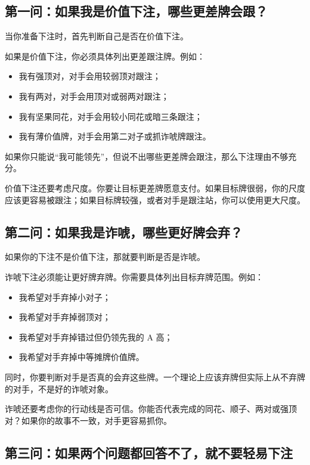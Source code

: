 \subsection{第一问：如果我是价值下注，哪些更差牌会跟？}

当你准备下注时，首先判断自己是否在价值下注。

如果是价值下注，你必须具体列出更差跟注牌。例如：

\begin{itemize}
\item 我有强顶对，对手会用较弱顶对跟注；
\item 我有两对，对手会用顶对或弱两对跟注；
\item 我有坚果同花，对手会用较小同花或暗三条跟注；
\item 我有薄价值牌，对手会用第二对子或抓诈唬牌跟注。
\end{itemize}

如果你只能说“我可能领先”，但说不出哪些更差牌会跟注，那么下注理由不够充分。

价值下注还要考虑尺度。你要让目标更差牌愿意支付。如果目标牌很弱，你的尺度应该更容易被跟注；如果目标牌较强，或者对手是跟注站，你可以使用更大尺度。

\subsection{第二问：如果我是诈唬，哪些更好牌会弃？}

如果你的下注不是价值下注，那就要判断是否是诈唬。

诈唬下注必须能让更好牌弃牌。你需要具体列出目标弃牌范围。例如：

\begin{itemize}
\item 我希望对手弃掉小对子；
\item 我希望对手弃掉弱顶对；
\item 我希望对手弃掉错过但仍领先我的 A 高；
\item 我希望对手弃掉中等摊牌价值牌。
\end{itemize}

同时，你要判断对手是否真的会弃这些牌。一个理论上应该弃牌但实际上从不弃牌的对手，不是好的诈唬对象。

诈唬还要考虑你的行动线是否可信。你能否代表完成的同花、顺子、两对或强顶对？如果你的故事不一致，对手更容易抓你。

\subsection{第三问：如果两个问题都回答不了，就不要轻易下注}

